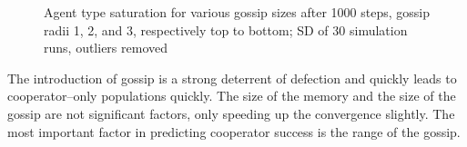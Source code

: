 \documentclass[runningheads]{llncs}
\begin{document}
\begin{figure}[!h]
  \centering
  \caption{Agent type saturation for various gossip sizes after 1000 steps, gossip radii 1, 2, and 3, respectively top to bottom; SD of 30 simulation runs, outliers removed}
  \label{fig:agent_sat/gossip_size_step1000}
\end{figure}

The introduction of gossip is a strong deterrent of defection and quickly leads to cooperator--only populations quickly.
The size of the memory and the size of the gossip are not significant factors, only speeding up the convergence slightly.
The most important factor in predicting cooperator success is the range of the gossip.
\end{document}

